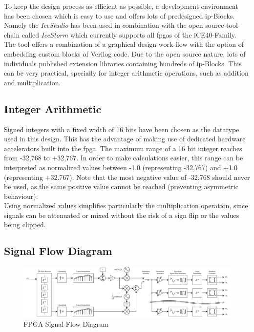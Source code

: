 To keep the design process as efficient as possible, a development environment has been chosen which is easy to use and offers lots of predesigned \acrshort{ip}-Blocks. Namely the \mbox{\textit{IceStudio}} has been used in combination with the open source tool-chain called \textit{IceStorm} which currently supports all \acrshort{fpga}s of the iCE40-Family.\\
The tool offers a combination of a graphical design work-flow with the option of embedding custom blocks of Verilog code. Due to the open source nature, lots of individuals published extension libraries containing hundreds of \acrshort{ip}-Blocks. This can be very practical, specially for integer arithmetic operations, such as addition and multiplication.

\subsection{Integer Arithmetic}
Signed integers with a fixed width of 16 bits have been chosen as the datatype used in this design. This has the advantage of making use of dedicated hardware accelerators built into the \acrshort{fpga}. The maximum range of a 16 bit integer reaches from -32,768 to +32,767. In order to make calculations easier, this range can be interpreted as normalized values between -1.0 (representing -32,767) and +1.0 (representing +32.767). Note that the most negative value of -32,768 should never be used, as the same positive value cannot be reached (preventing asymmetric behaviour).\\
Using normalized values simplifies particularly the multiplication operation, since signals can be attenuated or mixed without the risk of a sign flip or the values being clipped.
\newpage

\subsection{Signal Flow Diagram}
\enlargethispage{2.6cm}
\begin{figure}[h!]
	\centering
	\includegraphics[width=22.7cm, angle=90]{images/4_Design/FPGA/FPGA Block Diagram.pdf}
	\vspace{-0.2cm}
    \caption{FPGA Signal Flow Diagram}
    \label{fig:fpga-signal-flow}
\end{figure}

